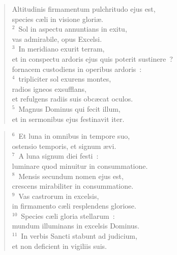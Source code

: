 \begin{flushleft}\begin{verse}\vspace{-19pt}\hspace{6pt}Altitudinis firmamentum pulchritudo ejus est,\\\hspace{6pt} species c\ae li in visione glori\ae .\\
${}^{2}$~Sol in aspectu annuntians in exitu,\\ vas admirabile, opus Excelsi.\\
${}^{3}$~In meridiano exurit terram,\\ et in conspectu ardoris ejus quis poterit sustinere~?\\ fornacem custodiens in operibus ardoris~:\\
${}^{4}$~tripliciter sol exurens montes,\\ radios igneos exsufflans,\\ et refulgens radiis suis obc\ae cat oculos.\\
${}^{5}$~Magnus Dominus qui fecit illum,\\ et in sermonibus ejus festinavit iter.\end{verse}\end{flushleft}


\begin{flushleft}\begin{verse}${}^{6}$~Et luna in omnibus in tempore suo,\\ ostensio temporis, et signum \ae vi.\\
${}^{7}$~A luna signum diei festi~:\\ luminare quod minuitur in consummatione.\\
${}^{8}$~Mensis secundum nomen ejus est,\\ crescens mirabiliter in consummatione.\\
${}^{9}$~Vas castrorum in excelsis,\\ in firmamento c\ae li resplendens gloriose.\\
${}^{10}$~Species c\ae li gloria stellarum~:\\ mundum illuminans in excelsis Dominus.\\
${}^{11}$~In verbis Sancti stabunt ad judicium,\\ et non deficient in vigiliis suis.\end{verse}\end{flushleft}



